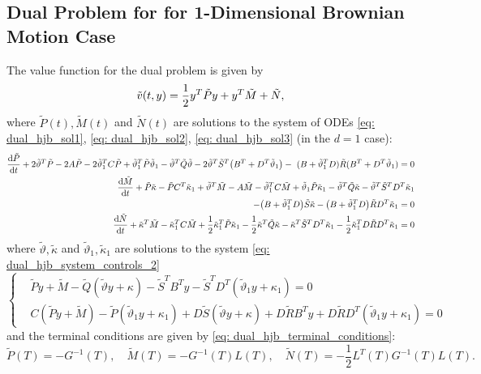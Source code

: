 \subsection{Dual Problem for for 1-Dimensional Brownian Motion Case}
The value function for the dual problem is given by 
\begin{equation*}
    \Tilde{v}(t, y) = \frac12 y^T \Tilde{P} y + y^T \Tilde{M} + \Tilde{N},
\end{equation*}
where $\tilde{P}(t), \tilde{M}(t)$ and $\tilde{N}(t)$ are solutions to the system of ODEs \eqref{eq: dual_hjb_sol1}, \eqref{eq: dual_hjb_sol2}, \eqref{eq: dual_hjb_sol3} (in the $d=1$ case):
\begin{align*}
     \frac{\mathop{}\!\mathrm{d} \tilde{P}}{\mathop{}\!\mathrm{d} t} + 2\tilde{\vartheta}^T \tilde{P} - 2A \tilde{P}  - 2\tilde{\vartheta}_1^T C \tilde{P} +  \tilde{\vartheta}_1^T \tilde{P} \tilde{\vartheta}_1 -  \tilde{\vartheta}^T \tilde{Q}\tilde{\vartheta} - 2\tilde{\vartheta}^T \tilde{S}^T \big(B^T + D^T \tilde{\vartheta}_1 \big)
    - \ (B + \tilde{\vartheta}_1^T D) \tilde{R} (B^T + D^T \tilde{\vartheta}_1) = 0\\
    \frac{\mathop{}\!\mathrm{d} \tilde{M}}{\mathop{}\!\mathrm{d} t} + \tilde{P} \tilde{\kappa} - \tilde{P} C^T \tilde{\kappa}_1 + \tilde{\vartheta}^T \tilde{M} - A\tilde{M} - \tilde{\vartheta}_1^T C \tilde{M} 
    + \tilde{\vartheta}_1 \tilde{P} \tilde{\kappa}_1 - \tilde{\vartheta}^T \tilde{Q} \tilde{\kappa} - \tilde{\vartheta}^T \tilde{S}^T  D^T \tilde{\kappa}_1\\
    - \big(B + \tilde{\vartheta}_1^T D \big)\tilde{S}\tilde{\kappa} - \big( B +  \tilde{\vartheta}_1^T D \big) \tilde{R} D^T \tilde{\kappa}_1 = 0 \\
    \frac{\mathop{}\!\mathrm{d} \tilde{N}}{\mathop{}\!\mathrm{d} t} + \tilde{\kappa}^T \tilde{M} - \tilde{\kappa}_1^T C \tilde{M} + \frac12 \tilde{\kappa}_1^T \tilde{P} \tilde{\kappa}_1 - \frac12 \tilde{\kappa}^T \tilde{Q}\tilde{\kappa} - \tilde{\kappa}^T \tilde{S}^T D^T\tilde{\kappa}_1 - \frac12 \tilde{\kappa}_1^T D \tilde{R}  D^T \tilde{\kappa}_1 = 0 
\end{align*}
where $\tilde{\vartheta}, \tilde{\kappa}$ and $\tilde{\vartheta}_1, \tilde{\kappa}_1$ are solutions to the system \eqref{eq: dual_hjb_system_controls_2}
\begin{equation*}
\begin{cases}
    &\tilde{P}y + \tilde{M} - \tilde{Q}(\tilde{\vartheta}y + \kappa) - \tilde{S}^T B^T y - \tilde{S}^T D^T (\tilde{\vartheta}_1 y + \kappa_1) = 0\\
    &C (\tilde{P}y + \tilde{M}) - \tilde{P} (\tilde{\vartheta}_1 y + \kappa_1)
    + D \tilde{S}(\tilde{\vartheta}y + \kappa) + D\tilde{R}B^T y +  D\tilde{R} D^T (\tilde{\vartheta}_1 y + \kappa_1) = 0
\end{cases} 
\end{equation*}
and the terminal conditions are given by \eqref{eq: dual_hjb_terminal_conditions}:
\begin{equation*}
    \tilde{P}(T) = -G^{-1}(T), \quad \tilde{M}(T) = - G^{-1}(T)L(T), \quad \tilde{N}(T) = - \frac12 L^T(T)G^{-1}(T)L(T).
\end{equation*}


